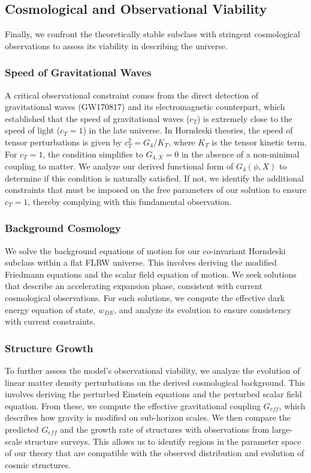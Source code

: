 \documentclass[twocolumn]{aastex631}
\begin{document}
\subsection{Cosmological and Observational Viability}
Finally, we confront the theoretically stable subclass with stringent cosmological observations to assess its viability in describing the universe.

\subsubsection{Speed of Gravitational Waves}
A critical observational constraint comes from the direct detection of gravitational waves (GW170817) and its electromagnetic counterpart, which established that the speed of gravitational waves ($c_T$) is extremely close to the speed of light ($c_T=1$) in the late universe. In Horndeski theories, the speed of tensor perturbations is given by $c_T^2 = G_4/K_T$, where $K_T$ is the tensor kinetic term. For $c_T=1$, the condition simplifies to $G_{4,X}=0$ in the absence of a non-minimal coupling to matter. We analyze our derived functional form of $G_4(\phi, X)$ to determine if this condition is naturally satisfied. If not, we identify the additional constraints that must be imposed on the free parameters of our solution to ensure $c_T=1$, thereby complying with this fundamental observation.

\subsubsection{Background Cosmology}
We solve the background equations of motion for our co-invariant Horndeski subclass within a flat FLRW universe. This involves deriving the modified Friedmann equations and the scalar field equation of motion. We seek solutions that describe an accelerating expansion phase, consistent with current cosmological observations. For such solutions, we compute the effective dark energy equation of state, $w_{DE}$, and analyze its evolution to ensure consistency with current constraints.

\subsubsection{Structure Growth}
To further assess the model's observational viability, we analyze the evolution of linear matter density perturbations on the derived cosmological background. This involves deriving the perturbed Einstein equations and the perturbed scalar field equation. From these, we compute the effective gravitational coupling $G_{eff}$, which describes how gravity is modified on sub-horizon scales. We then compare the predicted $G_{eff}$ and the growth rate of structures with observations from large-scale structure surveys. This allows us to identify regions in the parameter space of our theory that are compatible with the observed distribution and evolution of cosmic structures.
\end{document}
